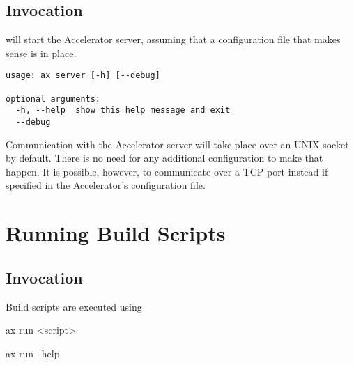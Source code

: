 \subsection{Invocation}
\begin{shell}
\end{shell}
will start the Accelerator server, assuming that a configuration file
that makes sense is in place.
\begin{shell}
\end{shell}
\begin{snugshade}
\begin{verbatim}
usage: ax server [-h] [--debug]

optional arguments:
  -h, --help  show this help message and exit
  --debug
\end{verbatim}%
\end{snugshade}
Communication with the Accelerator server will take place over an UNIX
socket by default.  There is no need for any additional configuration
to make that happen.  It is possible, however, to communicate over a
TCP port instead if specified in the Accelerator's configuration file.





\section{Running Build Scripts}
\label{sec:exec_runner}

\subsection{Invocation}
Build scripts are executed using
\begin{python}
ax run <script>
\end{python}

\begin{python}
ax run --help
\end{python}

